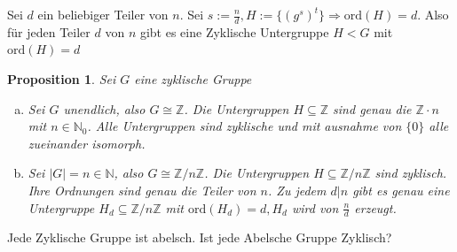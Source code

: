 \documentclass{article}
\newtheorem{proposition}[thm]{Proposition}
\newcommand{\N}{\mathbb{N}}
\newcommand{\Z}{\mathbb{Z}}
\newcommand{\ord}{\text{ord}}
\begin{document}
Sei $d$ ein beliebiger Teiler von $n$. Sei $s:=\frac{n}{d},
H:=\{(g^s)^t\}\Rightarrow\ord(H)=d$. Also für jeden
Teiler $d$ von $n$ gibt es eine Zyklische Untergruppe
$H<G$ mit $\ord(H)=d$
\begin{proposition}
    Sei $G$ eine zyklische Gruppe
    \begin{enumerate}[(a)]
        \item Sei $G$ unendlich, also $G\cong\Z$. Die
            Untergruppen $H\subseteq\Z$ sind genau die
            $\Z\cdot n$ mit $n\in\N_0$. Alle Untergruppen
            sind zyklische und mit ausnahme von $\{0\}$
            alle zueinander isomorph.
        \item Sei $|G|=n\in\N$, also $G\cong\Z/n\Z$. Die
            Untergruppen $H\subseteq\Z/n\Z$ sind zyklisch.
            Ihre Ordnungen sind genau die Teiler von $n$.
            Zu jedem $d|n$ gibt es genau eine Untergruppe
            $H_d\subseteq\Z/n\Z$ mit $\ord(H_d)=d,H_d$
            wird von $\frac{n}{d}$ erzeugt.
    \end{enumerate}
\end{proposition}
Jede Zyklische Gruppe ist abelsch. Ist jede Abelsche
Gruppe Zyklisch?
\end{document}
